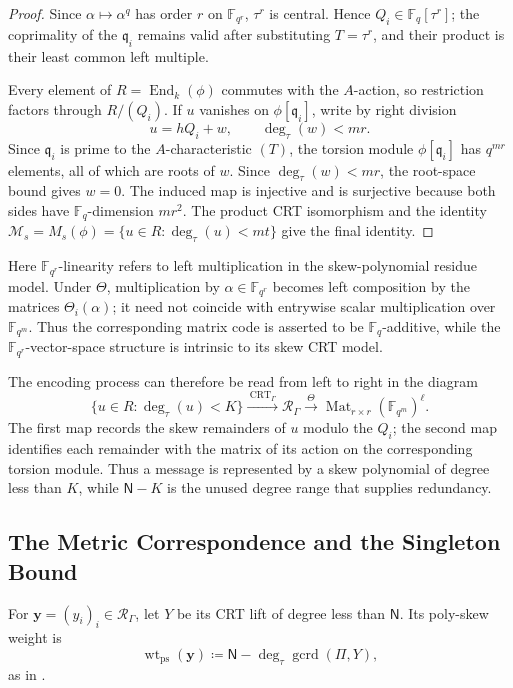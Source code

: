 \documentclass[10pt,a4paper]{amsart}
\DeclareMathOperator{\End}{End}
\DeclareMathOperator{\Mat}{Mat}
\DeclareMathOperator{\wt}{wt}
\theoremstyle{definition}
\theoremstyle{plain}
\theoremstyle{remark}
\newcommand{\vF}{\mathbb F}
\begin{document}
\begin{proof}
Since $\alpha\mapsto\alpha^q$ has order $r$ on $\vF_{q^r}$,
$\tau^r$ is central. Hence $Q_i\in\vF_q[\tau^r]$; the coprimality of the
$\mathfrak q_i$ remains valid after substituting $T=\tau^r$, and their
product is their least common left multiple.

Every element of $R=\End_k(\phi)$ commutes with the $A$-action, so
restriction factors through $R/(Q_i)$. If $u$ vanishes on
$\phi[\mathfrak q_i]$, write by right division
$$
u=hQ_i+w,
\qquad
\deg_\tau(w)<mr.
$$
Since $\mathfrak q_i$ is prime to the $A$-characteristic $(T)$, the torsion
module $\phi[\mathfrak q_i]$ has $q^{mr}$ elements, all of which are roots
of $w$. Since $\deg_\tau(w)<mr$, the root-space bound gives $w=0$. The
induced map is injective and is surjective because both sides have
$\vF_q$-dimension $mr^2$. The product CRT isomorphism and the identity
$\mathcal M_s=M_s(\phi)=\{u\in R:\deg_\tau(u)<mt\}$ give the final identity.
\end{proof}

Here $\vF_{q^r}$-linearity refers to left multiplication in the
skew-polynomial residue model. Under $\Theta$, multiplication by
$\alpha\in\vF_{q^r}$ becomes left composition by the matrices
$\Theta_i(\alpha)$; it need not coincide with entrywise scalar multiplication
over $\vF_{q^m}$.
Thus the corresponding matrix code is asserted to be $\vF_q$-additive, while
the $\vF_{q^r}$-vector-space structure is intrinsic to its skew CRT model.

The encoding process can therefore be read from left to right in the diagram
$$
\{u\in R:\deg_\tau(u)<K\}
\xrightarrow{\ \operatorname{CRT}_\Gamma\ }
\mathcal R_\Gamma
\xrightarrow{\ \Theta\ }
\Mat_{r\times r}(\vF_{q^m})^\ell.
$$
The first map records the skew remainders of $u$ modulo the $Q_i$; the second
map identifies each remainder with the matrix of its action on the
corresponding torsion module. Thus a message is represented by a skew
polynomial of degree less than $K$, while $\mathsf N-K$ is the unused degree
range that supplies redundancy.

\subsection{The Metric Correspondence and the Singleton Bound}

For $\boldsymbol y=(y_i)_i\in\mathcal R_\Gamma$,
let $Y$ be its CRT lift of degree less than $\mathsf N$. Its poly-skew weight
is
$$
\wt_{\mathrm{ps}}(\boldsymbol y)
\coloneqq
\mathsf N-\deg_\tau\operatorname{gcrd}(\Pi,Y),
$$
as in \cite[Definition~6]{NR26}.
\end{document}
